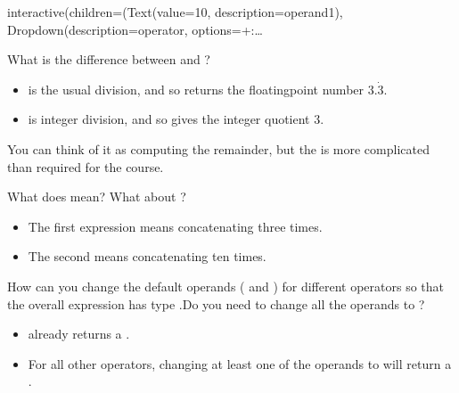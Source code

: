 \documentclass[letterpaper,10pt,english]{sphinxmanual}
\begin{document}
\begin{sphinxVerbatim}[commandchars=\\\{\}]
interactive(children=(Text(value=\PYGZsq{}10\PYGZsq{}, description=\PYGZsq{}operand1\PYGZsq{}), Dropdown(description=\PYGZsq{}operator\PYGZsq{}, options=\PYGZob{}\PYGZsq{}+\PYGZsq{}:…
\end{sphinxVerbatim}

 What is the difference between \sphinxcode{\sphinxupquote{/}} and \sphinxcode{\sphinxupquote{//}}?
\begin{itemize}
\item {} 
\sphinxcode{\sphinxupquote{/}} is the usual division, and so  returns the floating\sphinxhyphen{}point number \(3.\dot{3}\).

\item {} 
\sphinxcode{\sphinxupquote{//}} is integer division, and so  gives the integer quotient 3.

\end{itemize}


You can think of it as computing the remainder, but the  is more complicated than required for the course.

 What does  mean? What about ?
\begin{itemize}
\item {} 
The first expression means concatenating  three times.

\item {} 
The second means concatenating  ten times.

\end{itemize}

 How can you change the default operands ( and ) for different operators so that the overall expression has type .Do you need to change all the operands to ?
\begin{itemize}
\item {} 
\sphinxcode{\sphinxupquote{/}} already returns a .

\item {} 
For all other operators, changing at least one of the operands to  will return a .

\end{itemize}
\end{document}
